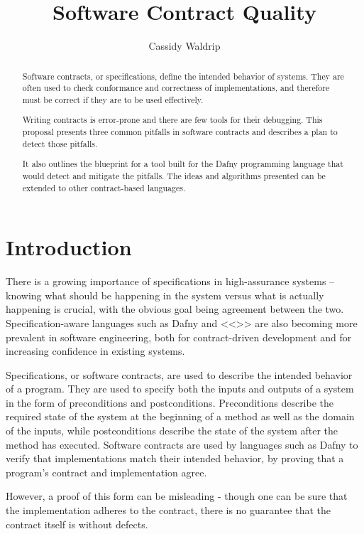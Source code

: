 \documentclass{article}
\title{Software Contract Quality}
\author{Cassidy Waldrip}
\newif\ifcomments
\newcommand{\egm}[1]{\ifcomments\textcolor{orange}{egm: #1}\fi}
\begin{document}
\maketitle

\begin{abstract}

Software contracts, or specifications, define the intended behavior of systems. They are often used to check
conformance and correctness of implementations, and therefore must be correct if they are to be used effectively.
\egm{Would it be better to use the term \emph{safe substitution}? So contracts are a declarative statement of computation and tools such as Dafny prove that an implementation is a safe substitution for the contract? Safe substitution would need to be defined informally.}
Writing contracts is error-prone and there are few tools for their debugging. This proposal presents three common
pitfalls in software contracts and describes a plan to detect those pitfalls.
\egm{I might suggest that the three common pitfalls be stated here intuitively.}
It also outlines the
blueprint for a tool built for the Dafny programming language that would detect and mitigate the pitfalls. The ideas
and algorithms presented can be extended to other contract-based languages.
\egm{Give an intuitive definition of Dafny (same for other terms). The introduction can give a proper definition of each of the concepts mentioned in the abstract.}

\end{abstract}

\section{Introduction}

There is a growing importance of specifications in high-assurance systems – knowing what should be happening
in the system versus what is actually happening is crucial, with the obvious goal being agreement
between the two. Specification-aware languages such as Dafny \cite{dafny} and <<>> are also becoming more prevalent in
software engineering, both for contract-driven development and for increasing confidence in existing systems.

Specifications, or software contracts, are used to describe the intended behavior of a program. They are used
to specify both the inputs and outputs of a system in the form of preconditions and postconditions. Preconditions
describe the required state of the system at the beginning of a method as well as the domain of the inputs,
while postconditions describe the state of the system after the method has executed. Software contracts
are used by languages such as Dafny to verify that implementations match their intended behavior, by proving
that a program’s contract and implementation agree.
\egm{I might suggest using \emph{safe substitution} above since Dafny proves an implementation is a safe substitution for a contract. It follows the Liskov principle---all need to be defined.}
However, a proof of this form can be misleading - though
one can be sure that the implementation adheres to the contract, there is no guarantee that the contract itself
is without defects.
\end{document}
